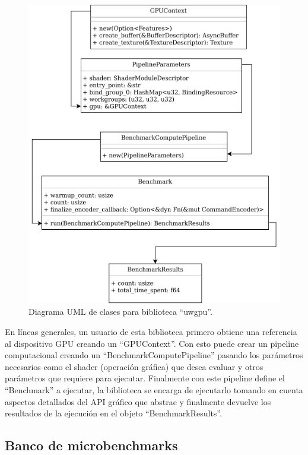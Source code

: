 \documentclass[conference]{IEEEtran}
\begin{document}
\begin{figure}
  \includegraphics[width=\linewidth]{images/Clases uwgpu.png}
  \caption{Diagrama UML de clases para biblioteca “uwgpu”.}
  \label{fig:diagrama_clases}
\end{figure}

En líneas generales, un usuario de esta biblioteca primero obtiene una
referencia al dispositivo GPU creando un “GPUContext”. Con esto puede
crear un pipeline computacional creando un “BenchmarkComputePipeline”
pasando los parámetros necesarios como el shader (operación gráfica) que desea
evaluar y otros parámetros que requiere para ejecutar. Finalmente con este
pipeline define el “Benchmark” a ejecutar, la biblioteca se encarga de
ejecutarlo tomando en cuenta aspectos detallados del API gráfico que abstrae y
finalmente devuelve los resultados de la ejecución en el objeto
“BenchmarkResults”.

\subsection{Banco de microbenchmarks}
\end{document}

